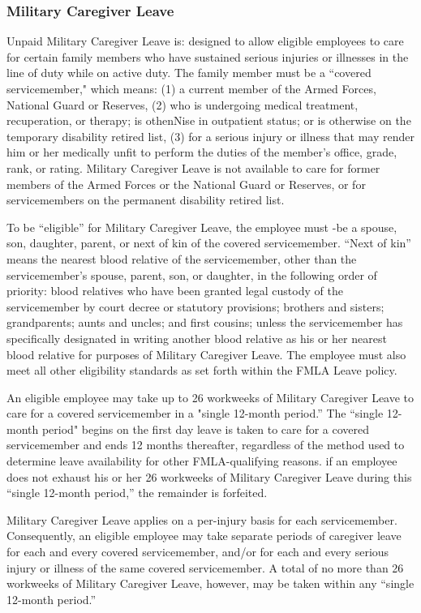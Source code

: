\subsubsection{Military Caregiver Leave}

Unpaid Military Caregiver Leave is: designed to allow eligible employees to care for certain family members who have sustained serious injuries or illnesses in the line of duty while on active duty. The family member must be a “covered servicemember," which means: (1) a current member of the Armed Forces, National Guard or Reserves, (2) who is undergoing medical treatment, recuperation, or therapy; is othenNise in outpatient status; or is otherwise on the temporary disability retired list, (3) for a serious injury or illness that may render him or her medically unfit to perform the duties of the member's office, grade, rank, or rating. Military Caregiver Leave is not available to care for former members of the Armed Forces or the National Guard or Reserves, or for servicemembers on the permanent disability retired list.

To be “eligible” for Military Caregiver Leave, the employee must -be a spouse, son, daughter, parent, or next of kin of the covered servicemember. “Next of kin” means the nearest blood relative of the servicemember, other than the servicemember’s spouse, parent, son, or daughter, in the following order of priority: blood relatives who have been granted legal custody of the servicemember by court decree or statutory provisions; brothers and sisters; grandparents; aunts and uncles; and first cousins; unless the servicemember has specifically designated in writing another blood relative as his or her nearest blood relative for purposes of Military Caregiver Leave. The employee must also meet all other eligibility standards as set forth within the FMLA Leave policy.

An eligible employee may take up to 26 workweeks of Military Caregiver Leave to care for a covered servicemember in a "single 12-month period.” The “single 12-month period" begins on the first day leave is taken to care for a covered servicemember and ends 12 months thereafter, regardless of the method used to determine leave availability for other FMLA-qualifying reasons. if an employee does not exhaust his or her 26 workweeks of Military Caregiver Leave during this “single 12-month period,” the remainder is forfeited.

Military Caregiver Leave applies on a per-injury basis for each servicemember. Consequently, an eligible employee may take separate periods of caregiver leave for each and every covered servicemember, and/or for each and every serious injury or illness of the same covered servicemember. A total of no more than 26 workweeks of Military Caregiver Leave, however, may be taken within any “single 12-month period.”

